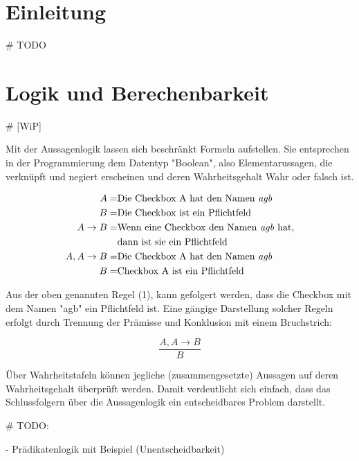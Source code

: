 \documentclass[runningheads,a4paper]{llncs}
\begin{document}
\section{Einleitung}
\# TODO
\newpage
\section{Logik und Berechenbarkeit}

\# [WiP]

Mit der Aussagenlogik lassen sich beschränkt Formeln aufstellen. Sie entsprechen in der Programmierung dem Datentyp "Boolean", also Elementarussagen, die verknüpft und negiert erscheinen und deren Wahrheitsgehalt Wahr oder falsch ist.

\begin{align}
\begin{split}
A = & \textnormal{Die Checkbox A hat den Namen \textit{agb}}\\
B = & \textnormal{Die Checkbox ist ein Pflichtfeld}\\
A \to B = & \textnormal{Wenn eine Checkbox den Namen \textit{agb} hat,} \\
& \textnormal{dann ist sie ein Pflichtfeld}\\
A, A \to B = & \textnormal{Die Checkbox A hat den Namen \textit{agb}} \\
B = & \textnormal{Checkbox A ist ein Pflichtfeld}
\end{split}
\end{align}

 

Aus der oben genannten Regel (1), kann gefolgert werden, dass die Checkbox mit dem Namen "agb" ein Pflichtfeld ist. Eine gängige Darstellung solcher Regeln erfolgt durch Trennung der Prämisse und Konklusion mit einem Bruchstrich:

\begin{equation}
\frac{A, A \to B}{B}
\end{equation}

 
 

Über Wahrheitstafeln können jegliche (zusammengesetzte) Aussagen auf deren Wahrheitsgehalt überprüft werden. Damit verdeutlicht sich einfach, dass das Schlussfolgern über die Aussagenlogik ein entscheidbares Problem darstellt.

\# TODO:

- Prädikatenlogik mit Beispiel (Unentscheidbarkeit)
\end{document}
